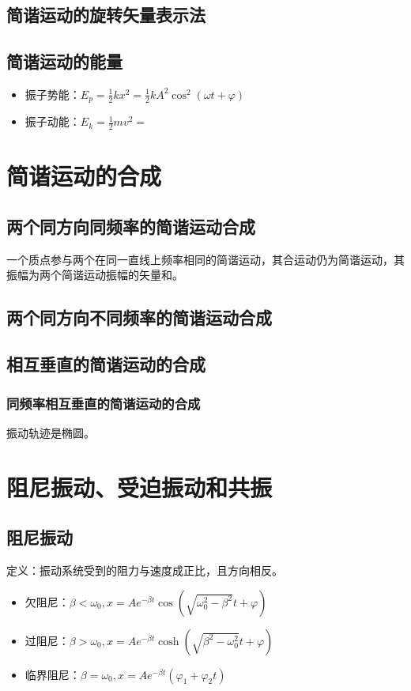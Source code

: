 \documentclass[12pt, a4paper, oneside]{ctexbook}
\begin{document}
\subsection{简谐运动的旋转矢量表示法}

\subsection{简谐运动的能量}
\begin{itemize}
    \item 振子势能：$E_p = \frac{1}{2}kx^2 = \frac{1}{2}kA^2\cos^2{(\omega t + \varphi)}$
    \item 振子动能：$E_k = \frac{1}{2}mv^2 = $
\end{itemize}

\section{简谐运动的合成}
\subsection{两个同方向同频率的简谐运动合成}
一个质点参与两个在同一直线上频率相同的简谐运动，其合运动仍为简谐运动，其振幅为两个简谐运动振幅的矢量和。

\subsection{两个同方向不同频率的简谐运动合成}

\subsection{相互垂直的简谐运动的合成}
\subsubsection{同频率相互垂直的简谐运动的合成}
振动轨迹是椭圆。

\section{阻尼振动、受迫振动和共振}

\subsection{阻尼振动}
定义：振动系统受到的阻力与速度成正比，且方向相反。
\begin{itemize}
    \item 欠阻尼：$\beta < \omega_0, x = Ae^{-\beta t}\cos{(\sqrt{\omega^2_0 - \beta^2 }t + \varphi)}$
    \item 过阻尼：$\beta > \omega_0, x = Ae^{-\beta t}\cosh{(\sqrt{\beta^2 - \omega^2_0 }t + \varphi)}$
    \item 临界阻尼：$\beta = \omega_0, x = Ae^{-\beta t}(\varphi_1 + \varphi_2t)$
\end{itemize}
\end{document}

